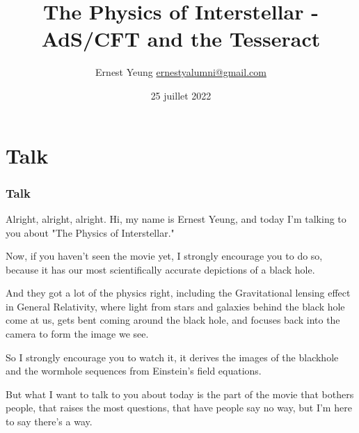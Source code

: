 \documentclass[10pt]{amsart}
\title{The Physics of Interstellar - AdS/CFT and the Tesseract}
\author{Ernest Yeung \href{mailto:ernestyalumni@gmail.com}{ernestyalumni@gmail.com}}
\date{25 juillet 2022}
\begin{document}
	
	
	\maketitle
	
	\begin{multicols*}{2}
		
		\setcounter{tocdepth}{1}
		\tableofcontents
		
		\begin{abstract}
						
		\end{abstract}
		
		\part{}


\end{multicols*}

\part{Talk}

\section{Talk}

Alright, alright, alright. Hi, my name is Ernest Yeung, and today I'm talking to you about "The Physics of Interstellar."

Now, if you haven't seen the movie yet, I strongly encourage you to do so, because it has our most scientifically accurate depictions of a black hole.

And they got a lot of the physics right, including the Gravitational lensing effect in General Relativity, where light from stars and galaxies behind the black hole come at us, gets bent coming around the black hole, and focuses back into the camera to form the image we see.

So I strongly encourage you to watch it, it derives the images of the blackhole and the wormhole sequences from Einstein's field equations.

But what I want to talk to you about today is the part of the movie that bothers people, that raises the most questions, that have people say no way, but I'm here to say there's a way.
\end{document}
